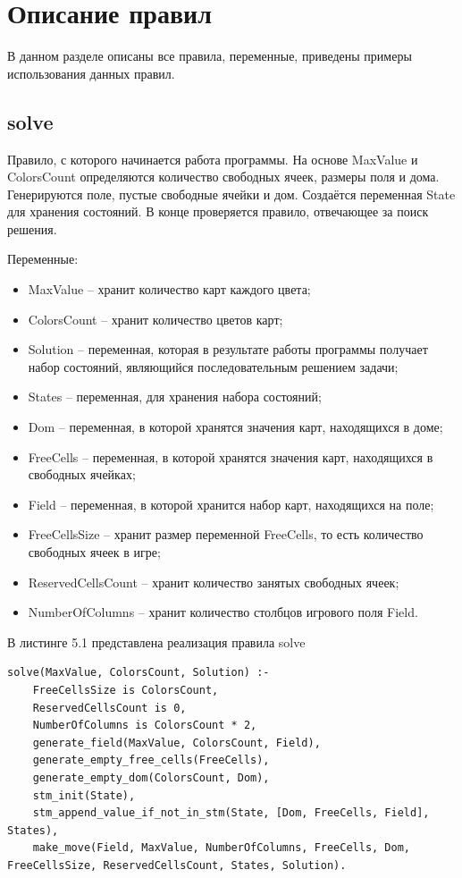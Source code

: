 \documentclass[12pt]{report}
\begin{document}
\chapter{Описание правил}
В данном разделе описаны все правила, переменные, приведены примеры использования данных правил.
\section{solve}
Правило, с которого начинается работа программы. На основе MaxValue и ColorsCount определяются количество свободных ячеек, размеры поля и дома. Генерируются поле, пустые свободные ячейки и дом. Создаётся переменная State для хранения состояний. В конце проверяется правило, отвечающее за поиск решения.

Переменные:
\begin{itemize}

\item MaxValue – хранит количество карт каждого цвета;
\item ColorsCount – хранит количество цветов карт;
\item Solution – переменная, которая в результате работы программы получает набор состояний, являющийся последовательным решением задачи;
\item States – переменная, для хранения набора состояний;
\item Dom – переменная, в которой хранятся значения карт, находящихся в доме;
\item FreeCells – переменная, в которой хранятся значения карт, находящихся в свободных ячейках;
\item Field – переменная, в которой хранится набор карт, находящихся на поле;
\item FreeCellsSize – хранит размер переменной FreeCells, то есть количество свободных ячеек в игре;
\item ReservedCellsCount – хранит количество занятых свободных ячеек;
\item NumberOfColumns – хранит количество столбцов игрового поля Field.
\end{itemize}

В листинге 5.1 представлена реализация правила solve

\begin{lstlisting}[label=some-code, caption=реализация правила solve]
solve(MaxValue, ColorsCount, Solution) :-
	FreeCellsSize is ColorsCount,
	ReservedCellsCount is 0,
	NumberOfColumns is ColorsCount * 2,
	generate_field(MaxValue, ColorsCount, Field),
	generate_empty_free_cells(FreeCells),
	generate_empty_dom(ColorsCount, Dom),
	stm_init(State),
	stm_append_value_if_not_in_stm(State, [Dom, FreeCells, Field], States),
	make_move(Field, MaxValue, NumberOfColumns, FreeCells, Dom, FreeCellsSize, ReservedCellsCount, States, Solution).
\end{lstlisting}
\end{document}

